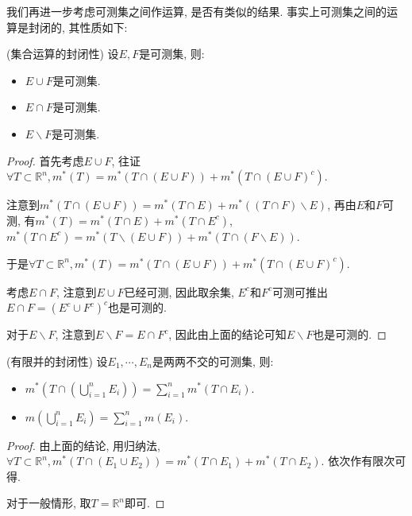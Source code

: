 \documentclass[theorem=false,mathfont=none,openany,sub3section]{easybook}
\begin{document}
我们再进一步考虑可测集之间作运算, 是否有类似的结果. 事实上可测集之间的运算是封闭的, 其性质如下:\par

\begin{proposition}
  (集合运算的封闭性) 设$E,F$是可测集, 则:\par
  \begin{itemize}
    \item $E\cup F$是可测集.
    \item $E\cap F$是可测集.
    \item $E\backslash F$是可测集.
  \end{itemize}
\end{proposition}

\begin{proof}
  首先考虑$E\cup F$, 往证$\forall T\subset \mathbb{R}^n, m^{*}(T)=m^{*}(T\cap (E\cup F))+m^{*}(T\cap (E\cup F)^c)$.\par
  注意到$m^{*}(T\cap (E\cup F))=m^{*}(T\cap E)+m^{*}((T\cap F)\backslash E)$, 再由$E$和$F$可测, 有$m^{*}(T)=m^{*}(T\cap E)+m^{*}(T\cap E^c)$, $m^{*}(T\cap E^c)=m^{*}(T\backslash (E\cup F))+m^{*}(T\cap (F\backslash E))$.\par
  于是$\forall T\subset \mathbb{R}^n, m^{*}(T)=m^{*}(T\cap (E\cup F))+m^{*}(T\cap (E\cup F)^c)$.\par
  考虑$E\cap F$, 注意到$E\cup F$已经可测, 因此取余集, $E^c$和$F^c$可测可推出$E\cap F=(E^c\cup F^c)^c$也是可测的.\par
  对于$E\backslash F$, 注意到$E\backslash F=E\cap F^c$, 因此由上面的结论可知$E\backslash F$也是可测的.\par
\end{proof}

\begin{corollary}
  (有限并的封闭性) 设$E_1,\cdots, E_n$是两两不交的可测集, 则:\par
  \begin{itemize}
    \item $m^{*}(T\cap (\bigcup_{i=1}^{n}E_i))=\sum_{i=1}^{n}m^{*}(T\cap E_i)$.
    \item $m(\bigcup_{i=1}^{n}E_i)=\sum_{i=1}^{n}m(E_i)$.
  \end{itemize}
\end{corollary}

\begin{proof}
  由上面的结论, 用归纳法, $\forall T\subset \mathbb{R}^n, m^{*}(T\cap (E_1 \cup E_2))=m^{*}(T\cap E_1)+m^{*}(T\cap E_2)$. 依次作有限次可得.\par
  对于一般情形, 取$T=\mathbb{R}^n$即可.\par
\end{proof}
\end{document}
